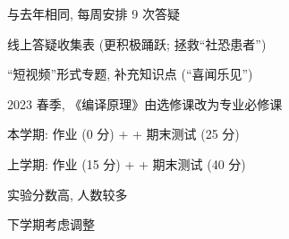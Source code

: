 \begin{frame}{}
  \begin{center}
    与去年相同, 每周安排 9 次答疑
  \end{center}
\end{frame}

\begin{frame}{}
  \begin{center}
     线上答疑收集表 (更积极踊跃; 拯救``社恐患者'')
  \end{center}
\end{frame}

\begin{frame}{}
\end{frame}

\begin{frame}{}
  \begin{center}
     ``短视频''形式专题, 补充知识点 (``喜闻乐见'')
  \end{center}
\end{frame}

\begin{frame}{}
  \begin{center}
    2023 春季, 《编译原理》由选修课改为专业必修课

    \vspace{0.30cm}
  \end{center}
\end{frame}

\begin{frame}{}
  \begin{center}
    本学期: {作业 (0 分) +  + 期末测试 (25 分)}

    \vspace{0.80cm}

    上学期: {作业 (15 分) +  + 期末测试 (40 分)}

    \vspace{1.50cm}
    实验分数高, 人数较多

    \vspace{0.60cm}
    下学期考虑调整
  \end{center}
\end{frame}

